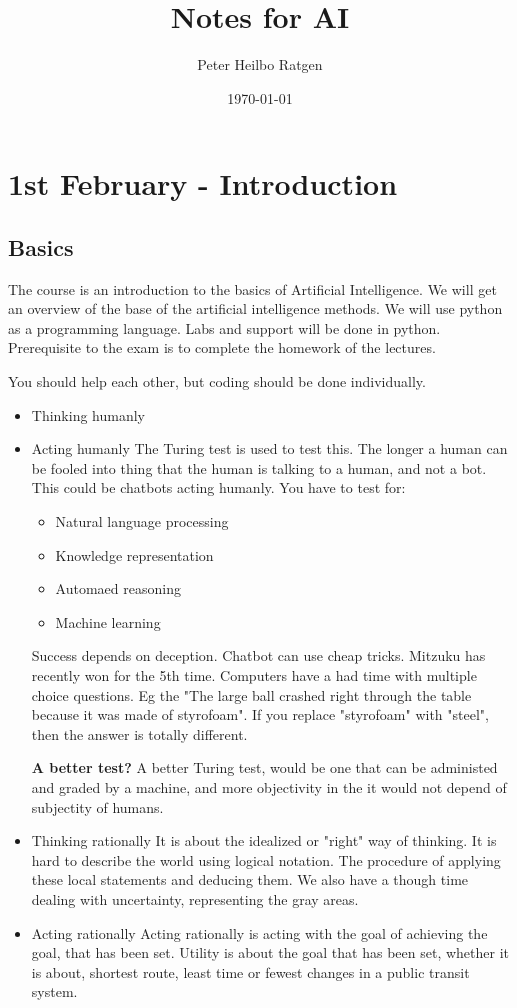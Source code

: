 \documentclass{article}
\title{Notes for AI}
\author{Peter Heilbo Ratgen}
\date{\today}
\begin{document}
\maketitle
\section{1st February - Introduction}%
\subsection{Basics}
The course is an introduction to the basics of Artificial Intelligence. We will
get an overview of the base of the artificial intelligence methods. We will use
python as a programming language. Labs and support will be done in python.
Prerequisite to the exam is to complete the homework of the lectures.

You should help each other, but coding should be done individually.
\begin{itemize}
  \item Thinking humanly
  \item Acting humanly
  \subitem The Turing test is used to test this. The longer a human can be
  fooled into thing that the human is talking to a human, and not a bot.  This
  could be chatbots acting humanly. You have to test for:
  \begin{itemize}
    \item Natural language processing
    \item Knowledge representation
    \item Automaed reasoning\
    \item Machine learning
  \end{itemize}
    Success depends on deception. Chatbot can use cheap tricks. Mitzuku has
    recently won for the 5th time.
    Computers have a had time with multiple choice questions. Eg the "The large
    ball crashed right through the table because it was made of styrofoam". If
    you replace "styrofoam" with "steel", then the answer is totally different.
    
    \textbf{A better test?} A better Turing test, would be one that can be
    administed and graded by a machine, and more objectivity in the it would not
    depend of subjectity of humans.

  \item Thinking rationally
    \subitem
    It is about the idealized or "right" way of thinking. It is hard to describe
    the world using logical notation. The procedure of applying these local
    statements and deducing them. 
    We also have a though time dealing with uncertainty, representing the gray
    areas.
  \item Acting rationally
    \subitem
    Acting rationally is acting with the goal of achieving the goal, that has
    been set. Utility is about the goal that has been set, whether it is about,
    shortest route, least time or fewest changes in a public transit system.
\end{itemize}
\end{document}

